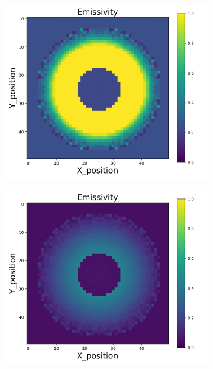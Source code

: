 \begin{figure}[p]
\begin{minipage}{\textwidth}
\begin{subfigure}{0.325\textwidth}
        \end{subfigure}
    \end{minipage}\\
    \begin{minipage}{\textwidth}
        \centering
        \begin{subfigure}{0.325\textwidth}
            \centering
            \includegraphics[width=\textwidth]{figures/raw_data/25/exp/emi_cal.jpg}
        \end{subfigure}
        \begin{subfigure}{0.325\textwidth}
            \centering
            \includegraphics[width=\textwidth]{figures/raw_data/26/exp/emi_cal.jpg}

\end{subfigure}
\end{minipage}
\end{figure}
